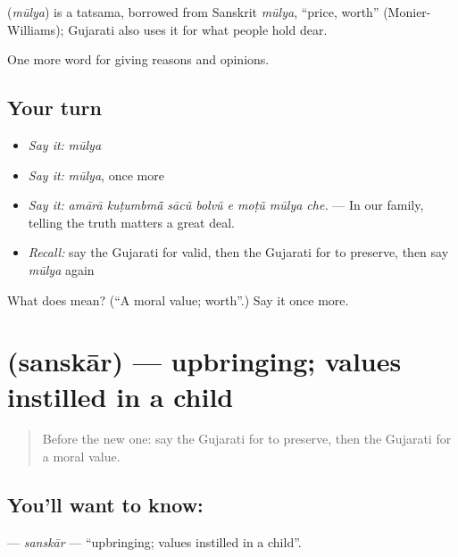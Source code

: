 \begin{cousinweb}
\textbf{} (\emph{mūlya}) is a tatsama, borrowed from Sanskrit \emph{mūlya}, \textquotedblleft{}price, worth\textquotedblright{} (Monier-Williams); Gujarati also uses it for what people hold dear.
\end{cousinweb}

\begin{grammarlens}[title={What you've built}]
One more word for giving reasons and opinions.
\end{grammarlens}

\subsection*{Your turn}
\begin{itemize}
\raggedright
  \item \emph{Say it:} \emph{mūlya}
  \item \emph{Say it:} \emph{mūlya}, once more
  \item \emph{Say it:} \emph{amārā kuṭumbmā̃ sācũ bolvũ e moṭũ mūlya che.} — In our family, telling the truth matters a great deal.
  \item \emph{Recall:} say the Gujarati for valid, then the Gujarati for to preserve, then say \emph{mūlya} again
\end{itemize}

\begin{tcolorbox}[breakable,colback=teal!4,colframe=teal!35!black,title={Before you move on}]
What does  mean? (\textquotedblleft{}A moral value; worth\textquotedblright{}.) Say it once more.
\end{tcolorbox}
\section[\texorpdfstring{\gu{સંસ્કાર} (sanskār)}{સંસ્કાર (sanskār)}]{ (sanskār) — upbringing; values instilled in a child}

\label{lesson:GU-C357-sanskar}



\begin{quote}
Before the new one: say the Gujarati for to preserve, then the Gujarati for a moral value.
\end{quote}

\subsection*{You'll want to know: }
\textbf{} — \emph{sanskār} — \textquotedblleft{}upbringing; values instilled in a child\textquotedblright{}.

